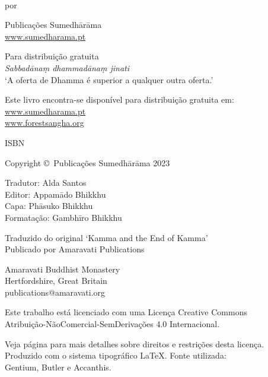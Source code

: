 \cleartoverso
\thispagestyle{empty}

{\copyrightsize
\centering
\setlength{\parindent}{0pt}%
\setlength{\parskip}{0.8\baselineskip}%

\thetitle\\
por \theauthor

Publicações Sumedhārāma\\
\href{https://sumedharama.pt}{www.sumedharama.pt}

Para distribuição gratuita\\
\textit{Sabbadānaṃ dhammadānaṃ jinati}\\
‘A oferta de Dhamma é superior a qualquer outra oferta.’

Este livro encontra-se disponível para distribuição gratuita em:\\
\href{https://sumedharama.pt}{www.sumedharama.pt}\\
\href{https://forestsangha.org}{www.forestsangha.org}

ISBN \theISBN

Copyright \copyright\ Publicações Sumedhārāma 2023

Tradutor: Alda Santos\\
Editor: Appamādo Bhikkhu\\
Capa: Phāsuko Bhikkhu\\
Formatação: Gambhīro Bhikkhu

Traduzido do original `Kamma and the End of Kamma'\\
Publicado por Amaravati Publications

Amaravati Buddhist Monastery\\
Hertfordshire, Great Britain\\
publications@amaravati.org

\vfill

{\footnotesize

Este trabalho está licenciado com uma Licença Creative Commons\\
Atribuição-NãoComercial-SemDerivações 4.0 Internacional.

Veja página \pageref{copyright-details} para mais detalhes sobre direitos e restrições desta licença.\\
Produzido com o sistema tipográfico \LaTeX. Fonte utilizada:\\
Gentium, Butler e Accanthis.

\theEditionInfo

}}
